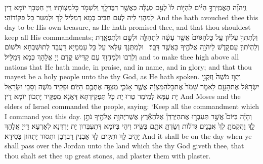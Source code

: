{וַֽיהֹוָ֞ה הֶאֱמִֽירְךָ֣ הַיּ֗וֹם לִהְי֥וֹת לוֹ֙ לְעַ֣ם סְגֻלָּ֔ה כַּאֲשֶׁ֖ר דִּבֶּר\maqqaf לָ֑ךְ וְלִשְׁמֹ֖ר כׇּל\maqqaf מִצְוֺתָֽיו׃}
{וַייָ חַטְבָךְ יוֹמָא דֵין לְמִהְוֵי לֵיהּ לְעַם חַבִּיב כְּמָא דְּמַלֵּיל לָךְ וּלְמִטַּר כָּל פִּקּוֹדוֹהִי׃}
{And the \lord\space hath avouched thee this day to be His own treasure, as He hath promised thee, and that thou shouldest keep all His commandments;}{}
{וּֽלְתִתְּךָ֣ עֶלְי֗וֹן עַ֤ל כׇּל\maqqaf הַגּוֹיִם֙ אֲשֶׁ֣ר עָשָׂ֔ה לִתְהִלָּ֖ה וּלְשֵׁ֣ם וּלְתִפְאָ֑רֶת וְלִֽהְיֹתְךָ֧ עַם\maqqaf קָדֹ֛שׁ לַיהֹוָ֥ה אֱלֹהֶ֖יךָ כַּאֲשֶׁ֥ר דִּבֵּֽר׃ \petucha }
{וּלְמִתְּנָךְ עִלַּאי עַל כָּל עַמְמַיָּא דַּעֲבַד לְתוּשְׁבְּחָא וּלְשׁוֹם וְלִרְבוּ וּלְמִהְוָךְ עַם קַדִּישׁ קֳדָם יְיָ אֱלָהָךְ כְּמָא דְּמַלֵּיל׃}
{and to make thee high above all nations that He hath made, in praise, and in name, and in glory; and that thou mayest be a holy people unto the \lord\space thy God, as He hath spoken.}{}
\newperek
{}
{וַיְצַ֤ו מֹשֶׁה֙ וְזִקְנֵ֣י יִשְׂרָאֵ֔ל אֶת\maqqaf הָעָ֖ם לֵאמֹ֑ר שָׁמֹר֙ אֶת\maqqaf כׇּל\maqqaf הַמִּצְוָ֔ה אֲשֶׁ֧ר אָנֹכִ֛י מְצַוֶּ֥ה אֶתְכֶ֖ם הַיּֽוֹם׃}
{וּפַקֵּיד מֹשֶׁה וְסָבֵי יִשְׂרָאֵל יָת עַמָּא לְמֵימַר טַרוּ יָת כָּל תַּפְקֵידְתָּא דַּאֲנָא מְפַקֵּיד יָתְכוֹן יוֹמָא דֵין׃}
{And Moses and the elders of Israel commanded the people, saying: ‘Keep all the commandment which I command you this day.}{}
{וְהָיָ֗ה בַּיּוֹם֮ אֲשֶׁ֣ר תַּעַבְר֣וּ אֶת\maqqaf הַיַּרְדֵּן֒ אֶל\maqqaf הָאָ֕רֶץ אֲשֶׁר\maqqaf יְהֹוָ֥ה אֱלֹהֶ֖יךָ נֹתֵ֣ן לָ֑ךְ וַהֲקֵמֹתָ֤ לְךָ֙ אֲבָנִ֣ים גְּדֹל֔וֹת וְשַׂדְתָּ֥ אֹתָ֖ם בַּשִּֽׂיד׃}
{וִיהֵי בְּיוֹמָא דְּתִעְבְּרוּן יָת יַרְדְּנָא לְאַרְעָא דַּייָ אֱלָהָךְ יָהֵיב לָךְ וּתְקִים לָךְ אַבְנִין רַבְרְבָן וּתְסוּד יָתְהוֹן בְּסִידָא׃}
{And it shall be on the day when ye shall pass over the Jordan unto the land which the \lord\space thy God giveth thee, that thou shalt set thee up great stones, and plaster them with plaster.}{}
